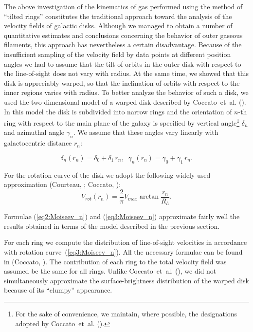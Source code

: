 \documentclass{ab}
\begin{document}
The above investigation of the kinematics of gas performed using
the  method of ``tilted rings'' constitutes the traditional
approach toward the analysis of the velocity fields of galactic
disks. Although we managed to obtain a number of quantitative
estimates and conclusions concerning the behavior of outer gaseous
filaments, this approach has nevertheless a certain disadvantage.
Because of the insufficient sampling of the velocity field by data
points at different position angles we had to assume that the tilt
of orbits in the outer disk with respect to the line-of-sight does
not vary with radius. At the same time, we showed that this disk
is appreciably warped, so that the inclination of orbits with
respect to the inner regions varies with radius. To better analyze
the behavior of such a disk, we used the two-dimensional model of
a warped disk described by Coccato~et~al. (\cite{coccato07:Moiseev_n}). In this model the disk is subdivided into narrow rings and the orientation of $n$-th ring with respect to the main plane of the galaxy is specified by
vertical angle\footnote{For the sake of convenience, we maintain,
where possible, the designations adopted by
Coccato~et~al. (\cite{coccato07:Moiseev_n}).} $\delta_n$ and
azimuthal angle $\gamma_n$. We assume that these angles vary
linearly with galactocentric distance $r_n$:

\begin{equation}
\delta_n(r_n)=\delta_0+\delta_1\,r_n, \;\;\gamma_n(r_n)=\gamma_0+\gamma_1\,r_n.
\label{eq2:Moiseev_n}
\end{equation}

For the rotation curve of the disk we adopt the following widely used approximation (Courteau, \cite{courteau97:Moiseev_n}; Coccato, \cite{coccato07:Moiseev_n}):
\begin{equation}
V_{rot}(r_n)=\frac{2}{\pi}V_{max}\arctan\frac{r_n}{R_h}.
\label{eq3:Moiseev_n}
\end{equation}

Formulae (\ref{eq2:Moiseev_n}) and (\ref{eq3:Moiseev_n})
approximate fairly well the results obtained in terms of the model
described in the previous section.

For each ring we compute the distribution of line-of-sight
velocities in accordance with rotation
curve~(\ref{eq3:Moiseev_n}). All the necessary formulae can be
found in (Coccato, \cite{coccato07:Moiseev_n}). The contribution of each ring
to the total velocity field was assumed be the same for all rings.
Unlike Coccato~et~al. (\cite{coccato07:Moiseev_n}), we did not
simultaneously approximate the surface-brightness distribution of
the warped disk because of its ``clumpy'' appearance.
\end{document}
